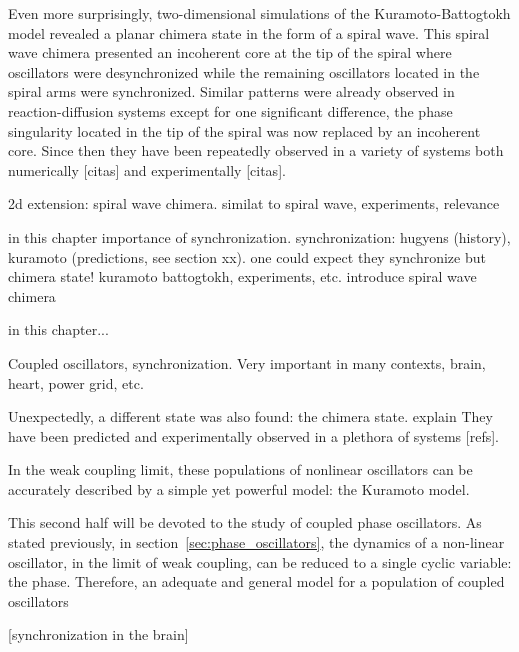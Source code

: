 Even more surprisingly, two-dimensional simulations of the Kuramoto-Battogtokh model
revealed a planar chimera state in the form of a spiral wave. This spiral wave chimera
presented an incoherent core at the tip of the spiral where oscillators were desynchronized
while the remaining oscillators located in the spiral arms were synchronized. Similar
patterns were already observed in reaction-diffusion systems except for one significant
difference, the phase singularity located in the tip of the spiral was now replaced by
an incoherent core. Since then they have been repeatedly observed in a variety of systems
both numerically [citas] and experimentally [citas]. 


2d extension: spiral wave chimera. similat to spiral wave, experiments, relevance

in this chapter
importance of synchronization. 
synchronization: hugyens (history), kuramoto (predictions, see section xx).
one could expect they synchronize but chimera state! kuramoto battogtokh,
experiments, etc. introduce spiral wave chimera

in this chapter...

Coupled oscillators, synchronization. Very important in many contexts, brain, heart,
power grid, etc.

Unexpectedly, a different state was also found: the chimera state. explain
They have been predicted and experimentally observed in a plethora of systems
[refs]. 

In the weak coupling limit, these populations of nonlinear oscillators can be accurately
described by a simple yet powerful model: the Kuramoto model. 


This second half will be devoted to the study of coupled phase oscillators. As
stated previously, in section~\ref{sec:phase_oscillators}, the dynamics of
a non-linear oscillator, in the limit of weak coupling, can be reduced
to a single cyclic variable: the phase. Therefore, an adequate and general model
for a population of coupled oscillators  

[synchronization in the brain] \cite{erra2017neuralsynchronization}


